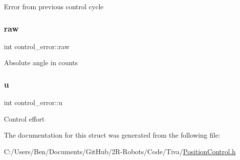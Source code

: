 Error from previous control cycle \mbox{\label{structcontrol__error_a872f13c1886cb584b7043e668b188548}} 
\subsubsection{\texorpdfstring{raw}{raw}}
{\footnotesize\ttfamily int control\+\_\+error\+::raw}

Absolute angle in counts \mbox{\label{structcontrol__error_aea13c87eda1433f414ce28363a3c9d07}} 
\subsubsection{\texorpdfstring{u}{u}}
{\footnotesize\ttfamily int control\+\_\+error\+::u}

Control effort 

The documentation for this struct was generated from the following file\+:\begin{DoxyCompactItemize}
\item 
C\+:/\+Users/\+Ben/\+Documents/\+Git\+Hub/2\+R-\/\+Robots/\+Code/\+Tiva/\mbox{\hyperlink{_position_control_8h}{Position\+Control.\+h}}\end{DoxyCompactItemize}
